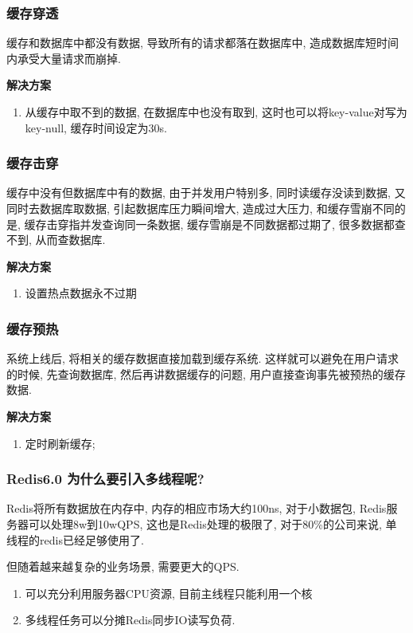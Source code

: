 \documentclass[UTF8]{ctexart}
\begin{document}
\subsubsection{缓存穿透}
缓存和数据库中都没有数据, 导致所有的请求都落在数据库中, 造成数据库短时间内承受大量请求而崩掉.
\par
\textbf{解决方案}
\begin{enumerate}

	\item 从缓存中取不到的数据, 在数据库中也没有取到, 这时也可以将key-value对写为key-null, 缓存时间设定为30s.

\end{enumerate}

\subsubsection{缓存击穿}
缓存中没有但数据库中有的数据, 由于并发用户特别多, 同时读缓存没读到数据, 又同时去数据库取数据, 引起数据库压力瞬间增大, 造成过大压力, 和缓存雪崩不同的是, 缓存击穿指并发查询同一条数据, 缓存雪崩是不同数据都过期了, 很多数据都查不到, 从而查数据库.
\par
\textbf{解决方案}
\begin{enumerate}
	\item 设置热点数据永不过期
\end{enumerate}
\subsubsection{缓存预热}
系统上线后, 将相关的缓存数据直接加载到缓存系统. 这样就可以避免在用户请求的时候, 先查询数据库, 然后再讲数据缓存的问题, 用户直接查询事先被预热的缓存数据.
\par
\textbf{解决方案}
\begin{enumerate}
	\item 定时刷新缓存;
\end{enumerate}
\subsubsection{Redis6.0 为什么要引入多线程呢?}
Redis将所有数据放在内存中, 内存的相应市场大约100ns, 对于小数据包, Redis服务器可以处理8w到10wQPS, 这也是Redis处理的极限了, 对于80\%的公司来说, 单线程的redis已经足够使用了.
\par
但随着越来越复杂的业务场景, 需要更大的QPS.
\begin{enumerate}
	\item 可以充分利用服务器CPU资源, 目前主线程只能利用一个核
	\item 多线程任务可以分摊Redis同步IO读写负荷.
\end{enumerate}
\end{document}
